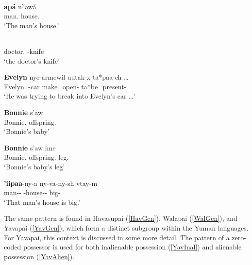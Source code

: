 \begin{exe}\ex\label{CocGen}
\gll \textbf{ap\'a} n\textsuperscript{y}aw\'a\\
     man.\acc{} house.\acc{}\\
\glt `The man's house.'
\end{exe}


\begin{exe}\ex\label{DieGen}
\gll \textbf{}  \\
doctor.\acc{} \poss{}-knife\\
\glt `the doctor's knife'
\end{exe}


\begin{exe}\ex\label{JamGen}
\gll \textbf{Evelyn} nye-armewil uutak-x ta*paa-ch \dots\\
Evelyn.\acc{} \ali{}-car make\_open-\irr{} ta*be\_present-\ssbj{}\\
\glt `He was trying to break into Evelyn's car \dots'
\end{exe} 

\begin{exe}\ex\label{MarGen}
\begin{xlist} 
\ex\gll \textbf{Bonnie} s'aw\\
Bonnie.\acc{} offspring.\acc{}\\
\glt `Bonnie's baby'

\ex\gll \textbf{Bonnie} s'aw ime\\
Bonnie.\acc{} offspring.\acc{} leg.\acc{}\\
\glt `Bonnie's baby's leg'

\ex\gll \textbf{'iipaa}-ny-a ny-va-ny-sh vtay-m\\
man-\dem{}-\augv{} \poss{}-house-\dem{}-\nom{} big-\rls{}\\
\glt `That man's house is big.'
\end{xlist}
\end{exe}

The same pattern is found in Havasupai (\ref{HavGen}), Walapai (\ref{WalGen}), and Yavapai (\ref{YavGen}), which form a distinct subgroup within the Yuman languages. 
For Yavapai, this context is discussed in some more detail. 
The pattern of a zero-coded possessor is used for both inalienable possession (\ref{YavInal}) and alienable possession (\ref{YavAlien}).
 
